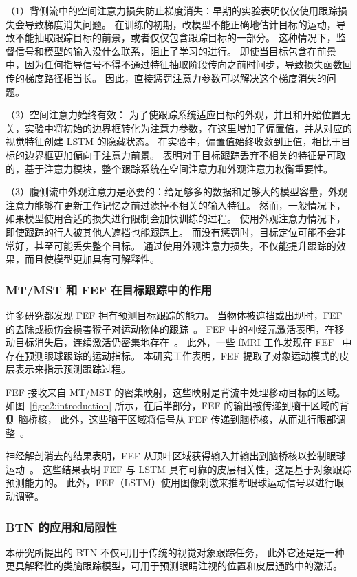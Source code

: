 （1）背侧流中的空间注意力损失防止梯度消失：早期的实验表明仅仅使用跟踪损失会导致梯度消失问题。
在训练的初期，改模型不能正确地估计目标的运动，导致不能抽取跟踪目标的前景，或者仅仅包含跟踪目标的一部分。
这种情况下，监督信号和模型的输入没什么联系，阻止了学习的进行。
即使当目标包含在前景中，因为任何指导信号不得不通过特征抽取阶段传向之前时间步，导致损失函数回传的梯度路径相当长。
因此，直接惩罚注意力参数可以解决这个梯度消失的问题。

（2）空间注意力始终有效：
为了使跟踪系统适应目标的外观，并且和开始位置无关，实验中将初始的边界框转化为注意力参数，在这里增加了偏置值，并从对应的视觉特征创建 LSTM 的隐藏状态。
在实验中，偏置值始终收敛到正值，相比于目标的边界框更加偏向于注意力前景。
表明对于目标跟踪丢弃不相关的特征是可取的，基于注意力模块，整个跟踪系统在空间注意力和外观注意力权衡重要性。

（3）腹侧流中外观注意力是必要的：给足够多的数据和足够大的模型容量，外观注意力能够在更新工作记忆之前过滤掉不相关的输入特征。
然而，一般情况下，如果模型使用合适的损失进行限制会加快训练的过程。
使用外观注意力情况下，即使跟踪的行人被其他人遮挡也能跟踪上。
而没有惩罚时，目标定位可能不会非常好，甚至可能丢失整个目标。
通过使用外观注意力损失，不仅能提升跟踪的效果，而且使模型更加具有可解释性。




\subsubsection{MT/MST 和 FEF 在目标跟踪中的作用}
许多研究都发现 FEF 拥有预测目标跟踪的能力。
当物体被遮挡或出现时，FEF 的去除或损伤会损害猴子对运动物体的跟踪~\cite{b11}。
FEF 中的神经元激活表明，在移动目标消失后，连续激活仍密集地存在~\cite{b14}。
此外，一些 fMRI 工作发现在 FEF~\cite{b33} 中存在预测眼球跟踪的运动指标。
本研究工作表明，FEF 提取了对象运动模式的皮层表示来指示预测跟踪过程。

FEF 接收来自 MT/MST 的密集映射，这些映射是背流中处理移动目标的区域。
如图~\ref{fig:c2:introduction} 所示，在后半部分，FEF 的输出被传递到脑干区域的背侧 脑桥核，
此外，这些脑干区域将信号从 FEF 传递到脑桥核，从而进行眼部调整~\cite{b36}。

神经解剖消去的结果表明，FEF 从顶叶区域获得输入并输出到脑桥核以控制眼球运动~\cite{b11}。
这些结果表明 FEF 与 LSTM 具有可靠的皮层相关性，这是基于对象跟踪预测能力的。
此外，FEF（LSTM）使用图像刺激来推断眼球运动信号以进行眼动调整。

\subsubsection{BTN 的应用和局限性}
本研究所提出的 BTN 不仅可用于传统的视觉对象跟踪任务，
此外它还是是一种更具解释性的类脑跟踪模型，可用于预测眼睛注视的位置和皮层通路中的激活。

